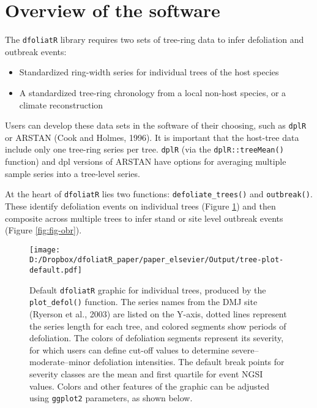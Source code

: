\documentclass[review]{elsarticle} %
\makeatletter
\providecommand{\tightlist}{%
  \setlength{\itemsep}{0pt}\setlength{\parskip}{0pt}}
\def\maxwidth{\ifdim\Gin@nat@width>\linewidth\linewidth
\else\Gin@nat@width\fi}
\let\Oldincludegraphics\includegraphics
\renewcommand{\includegraphics}[1]{\Oldincludegraphics[width=\maxwidth]{#1}}
\makeatother
\begin{document}
\hypertarget{overview-of-the-software}{%
\section{Overview of the software}\label{overview-of-the-software}}

The \texttt{dfoliatR} library requires two sets of tree-ring data to infer defoliation and outbreak events:

\begin{itemize}
\tightlist
\item
  Standardized ring-width series for individual trees of the host species
\item
  A standardized tree-ring chronology from a local non-host species, or a climate reconstruction
\end{itemize}

Users can develop these data sets in the software of their choosing, such as \texttt{dplR} or ARSTAN (Cook and Holmes, 1996). It is important that the host-tree data include only one tree-ring series per tree. \texttt{dplR} (via the \texttt{dplR::treeMean()} function) and dpl versions of ARSTAN have options for averaging multiple sample series into a tree-level series.

At the heart of \texttt{dfoliatR} lies two functions: \texttt{defoliate\_trees()} and \texttt{outbreak()}. These identify defoliation events on individual trees (Figure \ref{fig:fig-defol}) and then composite across multiple trees to infer stand or site level outbreak events (Figure \ref{fig:fig-obr}).



\begin{figure}
\centering
\texttt{[image: D:/Dropbox/dfoliatR\_paper/paper\_elsevier/Output/tree-plot-default.pdf]}
\caption{\label{fig:fig-defol}Default \texttt{dfoliatR} graphic for individual trees, produced by the \texttt{plot\_defol()} function. The series names from the DMJ site (Ryerson et al., 2003) are listed on the Y-axis, dotted lines represent the series length for each tree, and colored segments show periods of defoliation. The colors of defoliation segments represent its severity, for which users can define cut-off values to determine severe--moderate--minor defoliation intensities. The default break points for severity classes are the mean and first quartile for event NGSI values. Colors and other features of the graphic can be adjusted using \texttt{ggplot2} parameters, as shown below.}
\end{figure}
\end{document}
